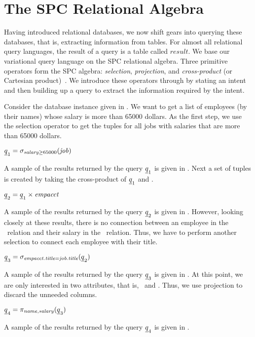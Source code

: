 \section{The SPC Relational Algebra}
\label{sec:ra}

Having introduced relational databases, we now shift gears into querying
these databases, that is, extracting information from tables.
For almost all relational query languages, the result of a query 
is a table called $\mathit{result}$. 
%
We base our variational query language on the SPC relational algebra.
Three primitive operators form the SPC algebra: \emph{selection}, \emph{projection},
and \emph{cross-product} (or Cartesian product)~\cite{AliceBook}.
We introduce these operators through  by stating an intent and then
building up a query to extract the information required by the intent. 

\begin{example}
\label{eg:ra}
Consider the database instance given in . We want to get a list
of employees (by their names) whose salary is more than 65000 dollars. 
As the first step, we use the selection operator to get the tuples for all jobs with salaries that 
are more than 65000 dollars.\\
%
\centerline{
\ensuremath{
{\pQ_1} = \sigma_{\salary \ge 65000} (\job)
}}
%
\noindent
A sample of the results returned by the query ${\pQ_1}$ is given in .
Next a set of 
 tuples is created by taking the cross-product of ${\pQ_1}$
and \empacct.\\
%
\centerline{
\ensuremath{
{\pQ_2} = {\pQ_1} \times \empacct
}}
%
\noindent
A sample of the results returned by the query ${\pQ_2}$ is given in .
However, looking closely at these results, there is no connection between an employee
in the \empacct\ relation and their salary in the \job\ relation. Thus, we have to perform 
another selection to connect each employee with their title. \\
%
\centerline{
\ensuremath{
{\pQ_3} = \sigma_{\empacct.\titleatt=\job.\titleatt} ({\pQ_2})
}}
%
\noindent
A sample of the results returned by the query ${\pQ_3}$ is given in .
At this point, we are only interested in two attributes, that is, \name\ and \salary.
Thus, we use projection to discard the unneeded columns.\\
%
\centerline{
\ensuremath{
{\pQ_4} = \pi_{\name, \salary} ({\pQ_3} )
}}
%
A sample of the results returned by the query ${\pQ_4}$ is given in .
\end{example}

